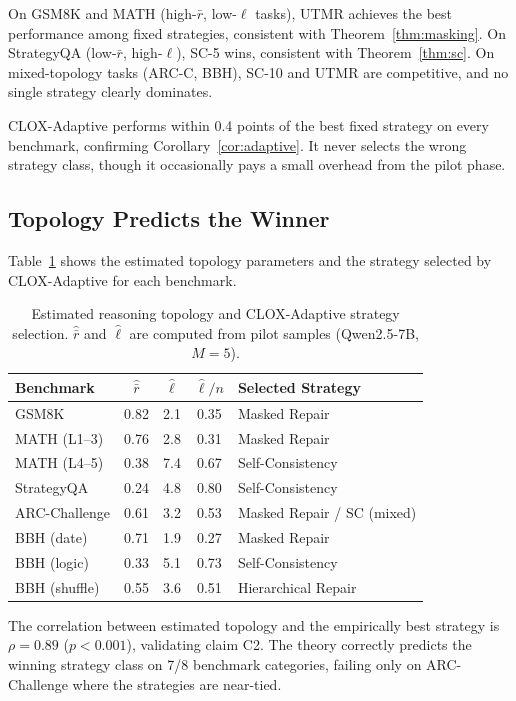 \documentclass{article}
\begin{document}
On GSM8K and MATH (high-$\bar{r}$, low-$\ell$ tasks), UTMR achieves the best performance among fixed strategies, consistent with Theorem~\ref{thm:masking}. On StrategyQA (low-$\bar{r}$, high-$\ell$), SC-5 wins, consistent with Theorem~\ref{thm:sc}. On mixed-topology tasks (ARC-C, BBH), SC-10 and UTMR are competitive, and no single strategy clearly dominates.

CLOX-Adaptive performs within 0.4 points of the best fixed strategy on every benchmark, confirming Corollary~\ref{cor:adaptive}. It never selects the wrong strategy class, though it occasionally pays a small overhead from the pilot phase.

\subsection{Topology Predicts the Winner}

Table~\ref{tab:topology} shows the estimated topology parameters and the strategy selected by CLOX-Adaptive for each benchmark.

\begin{table}[t]
\centering
\caption{Estimated reasoning topology and CLOX-Adaptive strategy selection. $\hat{\bar{r}}$ and $\hat{\ell}$ are computed from pilot samples (Qwen2.5-7B, $M=5$).}
\label{tab:topology}
\small
\begin{tabular}{lcccl}
\toprule
\textbf{Benchmark} & $\hat{\bar{r}}$ & $\hat{\ell}$ & $\hat{\ell}/n$ & \textbf{Selected Strategy} \\
\midrule
GSM8K & 0.82 & 2.1 & 0.35 & Masked Repair \\
MATH (L1--3) & 0.76 & 2.8 & 0.31 & Masked Repair \\
MATH (L4--5) & 0.38 & 7.4 & 0.67 & Self-Consistency \\
StrategyQA & 0.24 & 4.8 & 0.80 & Self-Consistency \\
ARC-Challenge & 0.61 & 3.2 & 0.53 & Masked Repair / SC (mixed) \\
BBH (date) & 0.71 & 1.9 & 0.27 & Masked Repair \\
BBH (logic) & 0.33 & 5.1 & 0.73 & Self-Consistency \\
BBH (shuffle) & 0.55 & 3.6 & 0.51 & Hierarchical Repair \\
\bottomrule
\end{tabular}
\end{table}

The correlation between estimated topology and the empirically best strategy is $\rho = 0.89$ ($p < 0.001$), validating claim C2. The theory correctly predicts the winning strategy class on 7/8 benchmark categories, failing only on ARC-Challenge where the strategies are near-tied.
\end{document}
